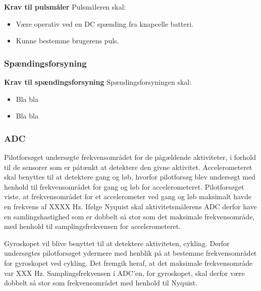\textbf{Krav til pulsmåler} \newline
Pulsmåleren skal:
\begin{itemize}
\item Være operativ ved en DC spænding fra knapcelle batteri.
\item Kunne bestemme brugerens puls.
\end{itemize}

\subsubsection{Spændingsforsyning}

\textbf{Krav til spændingsforsyning} \newline
Spændingsforsyningen skal:
\begin{itemize}
\item Bla bla
\item Bla bla
\end{itemize}



\subsubsection{ADC}
Pilotforsøget undersøgte frekvensområdet for de pågældende aktiviteter, i forhold til de sensorer som er påtænkt at detektere den givne aktivitet.\newline
Accelerometeret skal benyttes til at detektere gang og løb, hvorfor pilotforsøg blev undersøgt med henhold til frekvensområdet for gang og løb for accelerometeret. Pilotforsøget viste, at frekvensområdet for et accelerometer ved gang og løb maksimalt havde en frekvens af XXXX Hz. Ifølge Nyquist skal aktivitetsmålerens ADC derfor have en samlingshastighed som er dobbelt så stor som det maksimale frekvensområde, med henhold til samplingsfrekvensen for accelerometeret.\newline

Gyroskopet vil blive benyttet til at detektere aktiviteten, cykling. Derfor undersøgtes pilotforsøget ydermere med henblik på at bestemme frekvensområdet for gyroskopet ved cykling. Det fremgik heraf, at det maksimale frekvensområde var XXX Hz. Samplingsfrekvensen i ADC'en, for gyroskopet, skal derfor være dobbelt så stor som frekvensområdet med henhold til Nyquist. 


